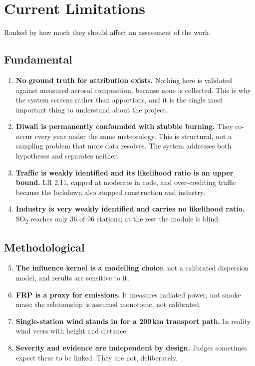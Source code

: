\documentclass[11pt,a4paper]{article}
\newcommand{\SOx}{SO\textsubscript{2}}
\begin{document}
\section{Current Limitations}
\label{sec:limits}

Ranked by how much they should affect an assessment of the work.

\subsection{Fundamental}

\begin{enumerate}
  \item \textbf{No ground truth for attribution exists.} Nothing here is validated
  against measured aerosol composition, because none is collected. This is why the
  system screens rather than apportions, and it is the single most important thing
  to understand about the project.
  \item \textbf{Diwali is permanently confounded with stubble burning.} They co-occur
  every year under the same meteorology. This is structural, not a sampling problem
  that more data resolves. The system addresses both hypotheses and separates
  neither.
  \item \textbf{Traffic is weakly identified and its likelihood ratio is an upper
  bound.} LR 2.11, capped at moderate in code, and over-crediting traffic because
  the lockdown also stopped construction and industry.
  \item \textbf{Industry is very weakly identified and carries no likelihood ratio.}
  \SOx{} reaches only 36 of 96 stations; at the rest the module is blind.
\end{enumerate}

\subsection{Methodological}

\begin{enumerate}\setcounter{enumi}{4}
  \item \textbf{The influence kernel is a modelling choice}, not a calibrated
  dispersion model, and results are sensitive to it.
  \item \textbf{FRP is a proxy for emissions.} It measures radiated power, not smoke
  mass; the relationship is assumed monotonic, not calibrated.
  \item \textbf{Single-station wind stands in for a 200\,km transport path.} In
  reality wind veers with height and distance.
  \item \textbf{Severity and evidence are independent by design.} Judges sometimes
  expect these to be linked. They are not, deliberately.
\end{enumerate}
\end{document}
